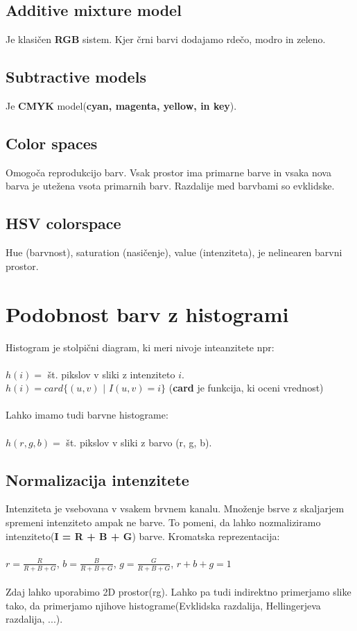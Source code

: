 \documentclass[11pt]{article}
\begin{document}
\subsection{Additive mixture model}
Je klasi\v{c}en \textbf{RGB} sistem. Kjer \v{c}rni barvi dodajamo rde\v{c}o, modro in zeleno.

\subsection{Subtractive models}
Je \textbf{CMYK} model(\textbf{cyan, magenta, yellow, in key}).

\newpage

\subsection{Color spaces}
Omogo\v{c}a reprodukcijo barv. Vsak prostor ima primarne barve in vsaka nova barva je utežena vsota primarnih barv. Razdalije med barvbami so evklidske.

\subsection{HSV colorspace}
Hue (barvnost), saturation (nasičenje), value (intenziteta), je nelinearen barvni prostor.

\section{Podobnost barv z histogrami}
Histogram je stolpi\v{c}ni diagram, ki meri nivoje inteanzitete npr: \\
\\
$h(i) =$ \v{s}t. pikslov v sliki z intenziteto $i$. \\
$h(i) = card\{(u,v)$ $|$ $I(u,v) = i\}$ (\textbf{card} je funkcija, ki oceni vrednost) \\
\\
Lahko imamo tudi barvne histograme: \\
\\
$h(r, g, b) =$ \v{s}t. pikslov v sliki z barvo (r, g, b).

\subsection{Normalizacija intenzitete}
Intenziteta je vsebovana v vsakem brvnem kanalu. Mno\v{z}enje bsrve z skaljarjem spremeni intenziteto ampak ne barve. To pomeni, da lahko nozmaliziramo intenziteto(\textbf{I = R + B + G}) barve. Kromatska reprezentacija: \\
\\
$r = \frac{R}{R+B+G}$, $b = \frac{B}{R+B+G}$, $g = \frac{G}{R+B+G}$, $r + b + g = 1$ \\
\\
Zdaj lahko uporabimo 2D prostor(rg). Lahko pa tudi indirektno primerjamo slike tako, da primerjamo njihove histograme(Evklidska razdalija, Hellingerjeva razdalija, ...).
\end{document}

